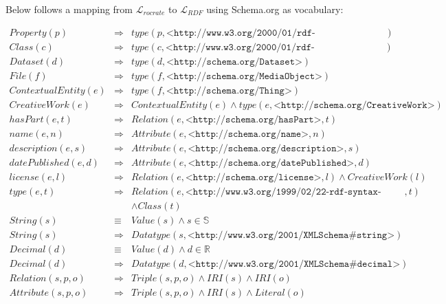 Below follows a mapping from $\mathcal{L}_{rocrate}$ to $\mathcal{L}_{RDF}$ using Schema.org as vocabulary:

\begin{eqnarray*}
Property(p)         & \Rightarrow &     type(p, \texttt{<http://www.w3.org/2000/01/rdf-schema\#Property>})   \\
Class(c)            & \Rightarrow &     type(c, \texttt{<http://www.w3.org/2000/01/rdf-schema\#Class>})  \\
Dataset(d)          & \Rightarrow &     type(d, \texttt{<http://schema.org/Dataset>})   \\
File(f)             & \Rightarrow &     type(f, \texttt{<http://schema.org/MediaObject>})   \\
ContextualEntity(e) & \Rightarrow &     type(f, \texttt{<http://schema.org/Thing>})   \\
CreativeWork(e)     & \Rightarrow &     ContextualEntity(e) \land type(e, \texttt{<http://schema.org/CreativeWork>})  \\
hasPart(e, t)       & \Rightarrow &     Relation(e, \texttt{<http://schema.org/hasPart>}, t)    \\
name(e, n)          & \Rightarrow &     Attribute(e, \texttt{<http://schema.org/name>}, n)  \\
description(e, s)   & \Rightarrow &     Attribute(e, \texttt{<http://schema.org/description>}, s)   \\
datePublished(e, d) & \Rightarrow &     Attribute(e, \texttt{<http://schema.org/datePublished>}, d) \\
license(e, l)       & \Rightarrow &     Relation(e, \texttt{<http://schema.org/license>}, l) \land CreativeWork(l) \\
type(e, t)          & \Rightarrow &     Relation(e, \texttt{<http://www.w3.org/1999/02/22-rdf-syntax-ns\#type>}, t) \\
                    & & \land Class(t)   \\
String(s)           & \equiv &          Value(s) \land  s \in \mathbb{S} \\
String(s)           & \Rightarrow &     Datatype(s, \texttt{<http://www.w3.org/2001/XMLSchema\#string>}) \\
Decimal(d)          & \equiv &          Value(d) \land  d \in \mathbb{R} \\
Decimal(d)          & \Rightarrow &     Datatype(d, \texttt{<http://www.w3.org/2001/XMLSchema\#decimal>}) \\
Relation(s,p,o)     & \Rightarrow &     Triple(s,p,o) \land IRI(s) \land IRI(o) \\
Attribute(s,p,o)    & \Rightarrow &     Triple(s,p,o) \land IRI(s) \land Literal(o) \\
\end{eqnarray*}

